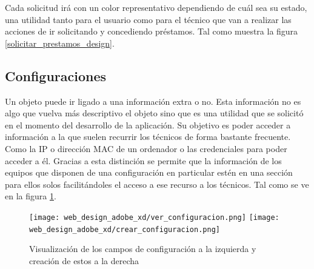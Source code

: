 Cada solicitud irá con un color representativo dependiendo de cuál sea su estado, una utilidad tanto para el usuario como para el técnico que van a realizar las acciones de ir solicitando y concediendo préstamos. Tal como muestra la figura \ref{solicitar_prestamos_design}.


\subsection{Configuraciones}

Un objeto puede ir ligado a una información extra o no. Esta información no es algo que vuelva más descriptivo el objeto sino que es una utilidad que se solicitó en el momento del desarrollo de la aplicación. Su objetivo es poder acceder a información a la que suelen recurrir los técnicos de forma bastante frecuente. Como la IP o dirección MAC de un ordenador o las credenciales para poder acceder a él. Gracias a esta distinción se permite que la información de los equipos que disponen de una configuración en particular estén en una sección para ellos solos facilitándoles el acceso a ese recurso a los técnicos. Tal como se ve en la figura \ref{configuracion_design}.

\begin{figure}[ht]
    \centering
    \texttt{[image: web\_design\_adobe\_xd/ver\_configuracion.png]}
    \texttt{[image: web\_design\_adobe\_xd/crear\_configuracion.png]}
    \caption{Visualización de los campos de configuración a la izquierda y creación de estos a la derecha}\label{configuracion_design}
\end{figure}